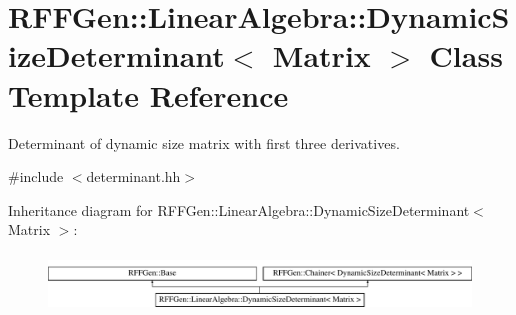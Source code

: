 \hypertarget{classRFFGen_1_1LinearAlgebra_1_1DynamicSizeDeterminant}{\section{R\-F\-F\-Gen\-:\-:Linear\-Algebra\-:\-:Dynamic\-Size\-Determinant$<$ Matrix $>$ Class Template Reference}
\label{classRFFGen_1_1LinearAlgebra_1_1DynamicSizeDeterminant}
}


Determinant of dynamic size matrix with first three derivatives.  




{\ttfamily \#include $<$determinant.\-hh$>$}

Inheritance diagram for R\-F\-F\-Gen\-:\-:Linear\-Algebra\-:\-:Dynamic\-Size\-Determinant$<$ Matrix $>$\-:\begin{figure}[H]
\begin{center}
\leavevmode
\includegraphics[height=1.559888cm]{classRFFGen_1_1LinearAlgebra_1_1DynamicSizeDeterminant}
\end{center}
\end{figure}
